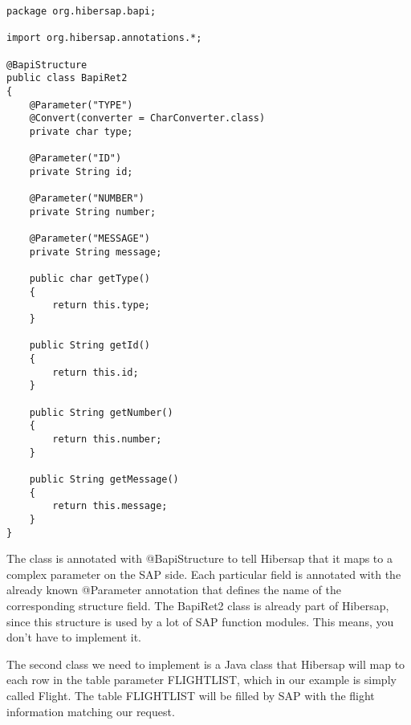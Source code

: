\begin{lstlisting}[caption=The BapiRet2 class]
package org.hibersap.bapi;

import org.hibersap.annotations.*;

@BapiStructure
public class BapiRet2
{
    @Parameter("TYPE")
    @Convert(converter = CharConverter.class)
    private char type;

    @Parameter("ID")
    private String id;

    @Parameter("NUMBER")
    private String number;

    @Parameter("MESSAGE")
    private String message;

    public char getType()
    {
        return this.type;
    }

    public String getId()
    {
        return this.id;
    }

    public String getNumber()
    {
        return this.number;
    }

    public String getMessage()
    {
        return this.message;
    }
}
\end{lstlisting}

The class is annotated with @BapiStructure to tell Hibersap that it maps to
a complex parameter on the SAP side. Each particular field is annotated with the
already known @Parameter annotation that defines the name of the corresponding structure field.
The BapiRet2 class is already part of Hibersap, since this structure is used by a lot of
SAP function modules. This means, you don't have to implement it.

The second class we need to implement is a Java class that Hibersap will map to each row in the 
table parameter FLIGHTLIST, which in our example is simply called Flight.
The table FLIGHTLIST will be filled by SAP with the flight information matching our request.

